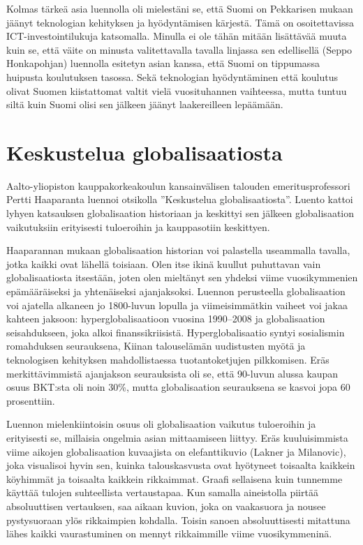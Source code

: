 \documentclass[12pt]{article}
\begin{document}
Kolmas tärkeä asia luennolla oli mielestäni se, että Suomi on Pekkarisen mukaan jäänyt teknologian kehityksen ja hyödyntämisen kärjestä. Tämä on osoitettavissa ICT-investointilukuja katsomalla. Minulla ei ole tähän mitään lisättävää muuta kuin se, että väite on minusta valitettavalla tavalla linjassa sen edellisellä (Seppo Honkapohjan) luennolla esitetyn asian kanssa, että Suomi on tippumassa huipusta koulutuksen tasossa. Sekä teknologian hyödyntäminen että koulutus olivat Suomen kiistattomat valtit vielä vuosituhannen vaihteessa, mutta tuntuu siltä kuin Suomi olisi sen jälkeen jäänyt laakereilleen lepäämään.


\newpage
\section{Keskustelua globalisaatiosta}

Aalto-yliopiston kauppakorkeakoulun kansainvälisen talouden emeritusprofessori Pertti Haaparanta luennoi otsikolla ''Keskustelua globalisaatiosta''. Luento kattoi lyhyen katsauksen globalisaation historiaan ja keskittyi sen jälkeen globalisaation vaikutuksiin erityisesti tuloeroihin ja kauppasotiin keskittyen.

Haaparannan mukaan globalisaation historian voi palastella useammalla tavalla, jotka kaikki ovat lähellä toisiaan. Olen itse ikinä kuullut puhuttavan vain globalisaatiosta itsestään, joten olen mieltänyt sen yhdeksi viime vuosikymmenien epämääräiseksi ja yhtenäiseksi ajanjaksoksi. Luennon perusteella globalisaation voi ajatella alkaneen jo 1800-luvun lopulla ja viimeisimmätkin vaiheet voi jakaa kahteen jaksoon: hyperglobalisaatioon vuosina 1990--2008 ja globalisaation seisahdukseen, joka alkoi finanssikriisistä. Hyperglobalisaatio syntyi sosialismin romahduksen seurauksena, Kiinan talouselämän uudistusten myötä ja teknologisen kehityksen mahdollistaessa tuotantoketjujen pilkkomisen. Eräs merkittävimmistä ajanjakson seurauksista oli se, että 90-luvun alussa kaupan osuus BKT:sta oli noin 30\%, mutta globalisaation seurauksena se kasvoi jopa 60 prosenttiin.

Luennon mielenkiintoisin osuus oli globalisaation vaikutus tuloeroihin ja erityisesti se, millaisia ongelmia asian mittaamiseen liittyy. Eräs kuuluisimmista viime aikojen globalisaation kuvaajista on elefanttikuvio (Lakner ja Milanovic), joka visualisoi hyvin sen, kuinka talouskasvusta ovat hyötyneet toisaalta kaikkein köyhimmät ja toisaalta kaikkein rikkaimmat. Graafi sellaisena kuin tunnemme käyttää tulojen suhteellista vertaustapaa. Kun samalla aineistolla piirtää absoluuttisen vertauksen, saa aikaan kuvion, joka on vaakasuora ja nousee pystysuoraan ylös rikkaimpien kohdalla. Toisin sanoen absoluuttisesti mitattuna lähes kaikki vaurastuminen on mennyt rikkaimmille viime vuosikymmeninä.
\end{document}
